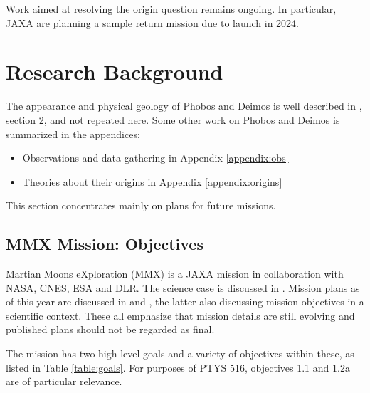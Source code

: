 Work aimed at resolving the origin question remains ongoing. In particular, JAXA are planning a sample return mission due to launch in 2024.


\section{Research Background}\label{section:background}

The appearance and physical geology of Phobos and Deimos is well described in \citet{michel_asteroids_2015}, section 2, and not repeated here.  Some other work on Phobos and Deimos is summarized in the appendices: 
\begin{itemize}
  	\setlength{\itemsep}{3pt}
	\setlength{\parskip}{0pt}
	\item Observations and data gathering in Appendix \ref{appendix:obs}
	\item Theories about their origins in Appendix \ref{appendix:origins}
\end{itemize}
This section concentrates mainly on plans for future missions.

\subsection{MMX Mission: Objectives}

Martian Moons eXploration (MMX) is a JAXA mission in collaboration with NASA, CNES, ESA and DLR. The science case is discussed in \citet{usui_importance_2020}. Mission plans as of this year are discussed in \citet{kawakatsu_preliminary_2022} and \citet{kuramoto_martian_2022}, the latter also discussing mission objectives in a scientific context. These all emphasize that mission details are still evolving and published plans should not be regarded as final.

The mission has two high-level goals and a variety of objectives within these, as listed in Table \ref{table:goals}. For purposes of PTYS 516, objectives 1.1 and 1.2a are of particular relevance.

